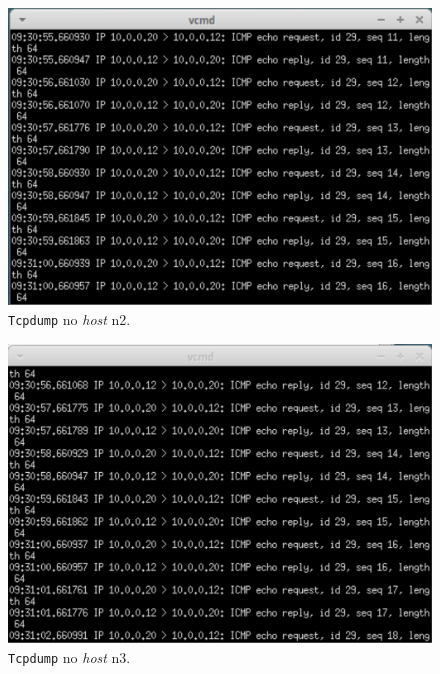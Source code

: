 \documentclass{llncs}
\begin{document}
\begin{figure}
  \begin{center}
	  \includegraphics[scale=0.3]{./imagens/n2_tcpdump_repetidor.png} 
  \end{center}
	\caption{\texttt{Tcpdump} no \textit{host} n2.}
  \label{fig:n2_repetidor}
\end{figure} 

\begin{figure}
  \begin{center}
	  \includegraphics[scale=0.3]{./imagens/n3_tcpdump_repetidor.png} 
  \end{center}
	\caption{\texttt{Tcpdump} no \textit{host} n3.}
  \label{fig:n3_repetidor}
\end{figure} 
\end{document}
